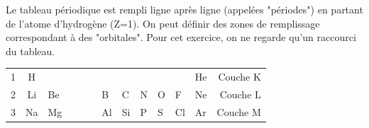 %
Le tableau p\'eriodique est rempli ligne apr\`es ligne (appel\'ees "p\'eriodes") en partant
de l'atome d'hydrog\`ene (Z=1). On peut d\'efinir des zones de remplissage correspondant \`a des
"orbitales". Pour cet exercice, on ne regarde qu'un raccourci du tableau.

\begin{center}
\begin{tabular}{rcllllllllllr}
1 & H  &    & & & &    &    &    &    &    & He & Couche K \\
2 & Li & Be & & & & B  & C  & N  & O  & F  & Ne & Couche L \\
3 & Na & Mg & & & & Al & Si & P  & S  & Cl & Ar & Couche M \\
\end{tabular}
\end{center}

